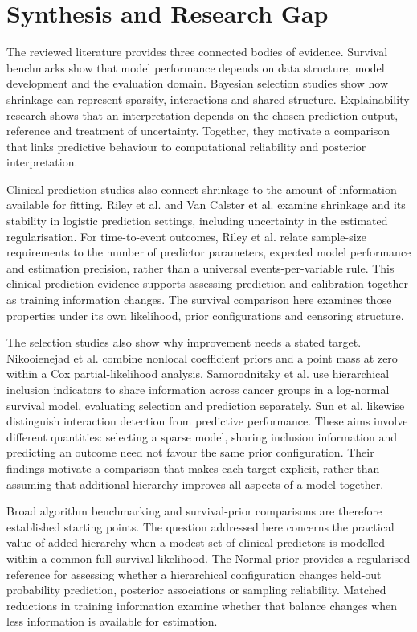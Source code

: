 \section{Synthesis and Research Gap}\label{synthesis-and-research-gap}

The reviewed literature provides three connected bodies of evidence. Survival benchmarks show that model performance depends on data structure, model development and the evaluation domain. Bayesian selection studies show how shrinkage can represent sparsity, interactions and shared structure. Explainability research shows that an interpretation depends on the chosen prediction output, reference and treatment of uncertainty. Together, they motivate a comparison that links predictive behaviour to computational reliability and posterior interpretation.

Clinical prediction studies also connect shrinkage to the amount of information available for fitting. Riley et al. \cite{riley2021shrinkage} and Van Calster et al. \cite{vancalster2020shrinkage} examine shrinkage and its stability in logistic prediction settings, including uncertainty in the estimated regularisation. For time-to-event outcomes, Riley et al. \cite{riley2019samplesize} relate sample-size requirements to the number of predictor parameters, expected model performance and estimation precision, rather than a universal events-per-variable rule. This clinical-prediction evidence supports assessing prediction and calibration together as training information changes. The survival comparison here examines those properties under its own likelihood, prior configurations and censoring structure.

The selection studies also show why improvement needs a stated target. Nikooienejad et al. \cite{ref6} combine nonlocal coefficient priors and a point mass at zero within a Cox partial-likelihood analysis. Samorodnitsky et al. \cite{ref42} use hierarchical inclusion indicators to share information across cancer groups in a log-normal survival model, evaluating selection and prediction separately. Sun et al. \cite{ref52} likewise distinguish interaction detection from predictive performance. These aims involve different quantities: selecting a sparse model, sharing inclusion information and predicting an outcome need not favour the same prior configuration. Their findings motivate a comparison that makes each target explicit, rather than assuming that additional hierarchy improves all aspects of a model together.

Broad algorithm benchmarking and survival-prior comparisons are therefore established starting points. The question addressed here concerns the practical value of added hierarchy when a modest set of clinical predictors is modelled within a common full survival likelihood. The Normal prior provides a regularised reference for assessing whether a hierarchical configuration changes held-out probability prediction, posterior associations or sampling reliability. Matched reductions in training information examine whether that balance changes when less information is available for estimation.

